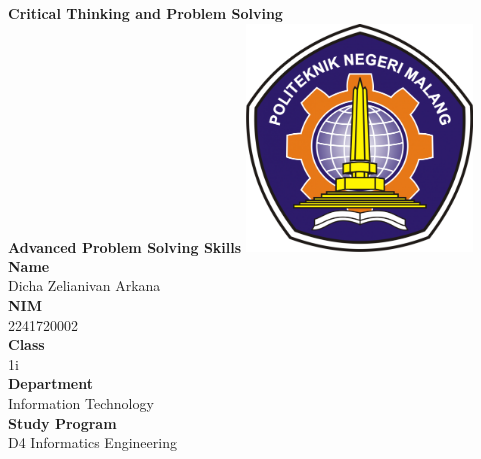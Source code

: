 \documentclass[12pt,titlepage]{article}
\newcommand{\vSubject}{Critical Thinking and Problem Solving}
\newcommand{\vSubtitle}{Advanced Problem Solving Skills}
\newcommand{\vName}{Dicha Zelianivan Arkana}
\newcommand{\vNIM}{2241720002}
\newcommand{\vClass}{1i}
\newcommand{\vDepartment}{Information Technology}
\newcommand{\vStudyProgram}{D4 Informatics Engineering}
\begin{document}
\begin{titlepage}
    \centering
    \vfill
    {\bfseries\LARGE
        \vSubject\\
        \vskip0.25cm
        \vSubtitle
    }
    \vfill
    \includegraphics[width=6cm]{images/polinema-logo.png}
    \vfill
    {
        \textbf{Name}\\
        \vName\\
        \vskip0.5cm
        \textbf{NIM}\\
        \vNIM\\
        \vskip0.5cm
        \textbf{Class}\\
        \vClass\\
        \vskip0.5cm
        \textbf{Department}\\
        \vDepartment\\
        \vskip0.5cm
        \textbf{Study Program}\\
        \vStudyProgram
    }
\end{titlepage}
\end{document}
